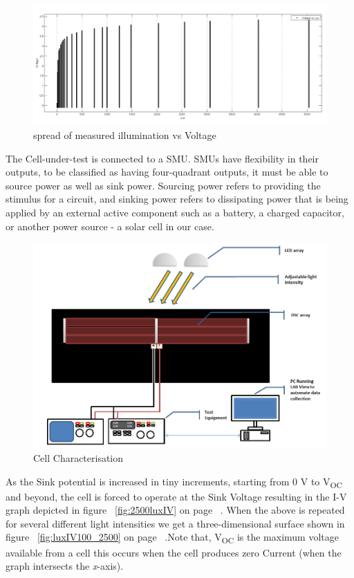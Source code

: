  \begin{figure}[H]
  \begin{center}
	\includegraphics[width=0.9\linewidth]{images/Voltagevlux}
	\caption{spread of measured illumination vs Voltage  }
	\label{fig:Voltagevlux}
  \end{center}
 \end{figure}
 The Cell-under-test is connected to a \ac{SMU}. \ac{SMU}s have flexibility in their outputs, to be classified as having four-quadrant outputs, it must be able to source power as well as sink power. Sourcing power refers to providing the stimulus for a circuit, and sinking power refers to dissipating power that is being applied by an external active component such as a battery, a charged capacitor, or another power source \cite{NI_SMU} - a solar cell in our case.
 \begin{figure}[H]
	  \begin{center}
		  \includegraphics[width=\textwidth]{images/Cell_under_test}
		  \caption{Cell Characterisation }
		  \label{fig:Cell_U_test}
	  \end{center}
 \end{figure}
 As the Sink potential is increased in tiny increments, starting from  0 V to V\textsubscript{OC} and beyond, the cell is forced to operate at the Sink Voltage resulting in the I-V graph depicted in figure ~\ref{fig:2500luxIV} on page ~\pageref{fig:2500luxIV}. When the above is repeated for several different light intensities we get a three-dimensional surface shown in figure ~\ref{fig:luxIV100_2500} on page ~\pageref{fig:luxIV100_2500}.Note that, V\textsubscript{OC} is the maximum voltage available from a cell this occurs when the cell produces zero Current (when the graph intersects the \textit{x}-axis).\\
 
